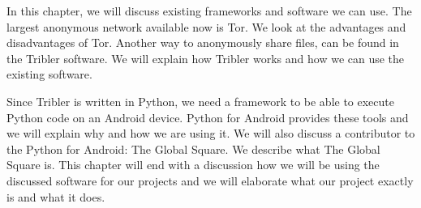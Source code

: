 
In this chapter, we will discuss existing frameworks and software we can use. The largest anonymous network available now is Tor. We look at the advantages and disadvantages of Tor. Another way to anonymously share files, can be found in the Tribler software. We will explain how Tribler works and how we can use the existing software.
	
Since Tribler is written in Python, we need a framework to be able to execute Python code on an Android device. Python for Android provides these tools and we will explain why and how we are using it. We will also discuss a contributor to the Python for Android: The Global Square. We describe what The Global Square is. This chapter will end with a discussion how we will be using the discussed software for our projects and we will elaborate what our project exactly is and what it does.

